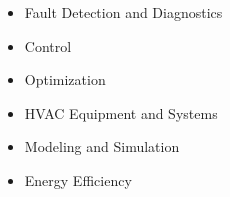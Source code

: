 

\begin{cvexpertise}
  \begin{itemize}
    \item Fault Detection and Diagnostics
    \item Control
    \item Optimization
    \vfill
    \item HVAC Equipment and Systems
    \item Modeling and Simulation
    \item Energy Efficiency
  \end{itemize}
\end{cvexpertise}

